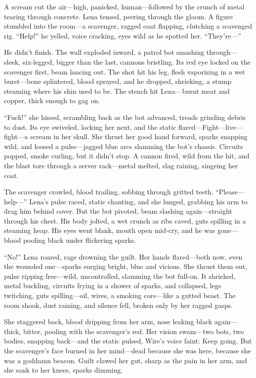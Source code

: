 \documentclass[12pt]{book}
\begin{document}
A scream cut the air---high, panicked, human---followed by the crunch of metal tearing through concrete. Lena tensed, peering through the gloom. A figure stumbled into the room---a scavenger, ragged coat flapping, clutching a scavenged rig. ``Help!'' he yelled, voice cracking, eyes wild as he spotted her. ``They’re---''

He didn’t finish. The wall exploded inward, a patrol bot smashing through---sleek, six-legged, bigger than the last, cannons bristling. Its red eye locked on the scavenger first, beam lancing out. The shot hit his leg, flesh vaporizing in a wet burst---bone splintered, blood sprayed, and he dropped, shrieking, a stump steaming where his shin used to be. The stench hit Lena---burnt meat and copper, thick enough to gag on.

``Fuck!'' she hissed, scrambling back as the bot advanced, treads grinding debris to dust. Its eye swiveled, locking her next, and the static flared---Fight---live---fight---a scream in her skull. She thrust her good hand forward, sparks snapping wild, and loosed a pulse---jagged blue arcs slamming the bot’s chassis. Circuits popped, smoke curling, but it didn’t stop. A cannon fired, wild from the hit, and the blast tore through a server rack---metal melted, slag raining, singeing her coat.

The scavenger crawled, blood trailing, sobbing through gritted teeth. ``Please---help---'' Lena’s pulse raced, static chanting, and she lunged, grabbing his arm to drag him behind cover. But the bot pivoted, beam slashing again---straight through his chest. His body jolted, a wet crunch as ribs caved, guts spilling in a steaming heap. His eyes went blank, mouth open mid-cry, and he was gone---blood pooling black under flickering sparks.

``No!'' Lena roared, rage drowning the guilt. Her hands flared---both now, even the wounded one---sparks surging bright, blue and vicious. She thrust them out, pulse ripping free---wild, uncontrolled, slamming the bot full-on. It shrieked, metal buckling, circuits frying in a shower of sparks, and collapsed, legs twitching, guts spilling---oil, wires, a smoking core---like a gutted beast. The room shook, dust raining, and silence fell, broken only by her ragged gasps.

She staggered back, blood dripping from her arm, nose leaking black again---thick, bitter, pooling with the scavenger’s red. Her vision swam---two bots, two bodies, snapping back---and the static pulsed, Wire’s voice faint: Keep going. But the scavenger’s face burned in her mind---dead because she was here, because she was a goddamn beacon. Guilt clawed her gut, sharp as the pain in her arm, and she sank to her knees, sparks dimming.
\end{document}
